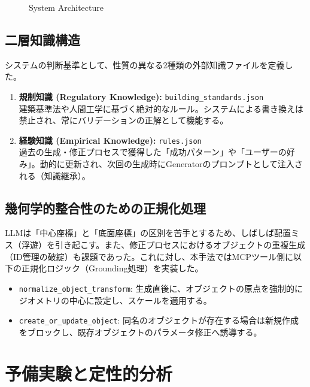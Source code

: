 \documentclass{deimj}
\begin{document}
\begin{figure}[t]
 \centering
 \caption{System Architecture}
 \label{fig:architecture}
\end{figure}

\subsection{二層知識構造}
システムの判断基準として、性質の異なる2種類の外部知識ファイルを定義した。

\begin{enumerate}
  \item \textbf{規制知識 (Regulatory Knowledge):} \texttt{building\_standards.json}\\
  建築基準法や人間工学に基づく絶対的なルール。システムによる書き換えは禁止され、常にバリデーションの正解として機能する。
  \item \textbf{経験知識 (Empirical Knowledge):} \texttt{rules.json}\\
  過去の生成・修正プロセスで獲得した「成功パターン」や「ユーザーの好み」。動的に更新され、次回の生成時にGeneratorのプロンプトとして注入される（知識継承）。
\end{enumerate}

\subsection{幾何学的整合性のための正規化処理}
LLMは「中心座標」と「底面座標」の区別を苦手とするため、しばしば配置ミス（浮遊）を引き起こす。また、修正プロセスにおけるオブジェクトの重複生成（ID管理の破綻）も課題であった。これに対し、本手法ではMCPツール側に以下の正規化ロジック（Grounding処理）を実装した。
\begin{itemize}
  \item \texttt{normalize\_object\_transform}: 生成直後に、オブジェクトの原点を強制的にジオメトリの中心に設定し、スケールを適用する。
  \item \texttt{create\_or\_update\_object}: 同名のオブジェクトが存在する場合は新規作成をブロックし、既存オブジェクトのパラメータ修正へ誘導する。
\end{itemize}

\section{予備実験と定性的分析}
\end{document}
